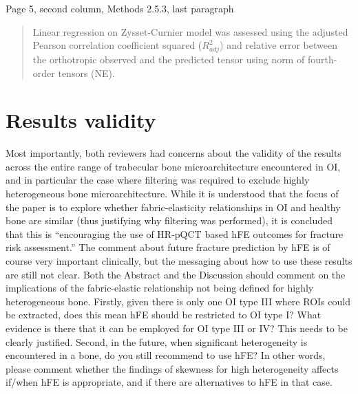 \documentclass{AR2RC}
\begin{document}
Page 5, second column, Methods 2.5.3, last paragraph
\begin{quote}
	Linear regression on Zysset-Curnier model was assessed using the adjusted Pearson correlation coefficient squared ($R^2_{adj}$) and relative error between the orthotropic observed and the predicted tensor using norm of fourth-order tensors (NE). 
\end{quote}

\section{Results validity}
\RC Most importantly, both reviewers had concerns about the validity of the results across the entire range of trabecular bone microarchitecture encountered in OI, and in particular the case where filtering was required to exclude highly heterogeneous bone microarchitecture. While it is understood that the focus of the paper is to explore whether fabric-elasticity relationships in OI and healthy bone are similar (thus justifying why filtering was performed), it is concluded that this is “encouraging the use of HR-pQCT based hFE outcomes for fracture risk assessment.” The comment about future fracture prediction by hFE is of course very important clinically, but the messaging about how to use these results are still not clear. Both the Abstract and the Discussion should comment on the implications of the fabric-elastic relationship not being defined for highly heterogeneous bone. Firstly, given there is only one OI type III where ROIs could be extracted, does this mean hFE should be restricted to OI type I? What evidence is there that it can be employed for OI type III or IV? This needs to be clearly justified. Second, in the future, when significant heterogeneity is encountered in a bone, do you still recommend to use hFE? In other words, please comment whether the findings of skewness for high heterogeneity affects if/when hFE is appropriate, and if there are alternatives to hFE in that case.
\end{document}
